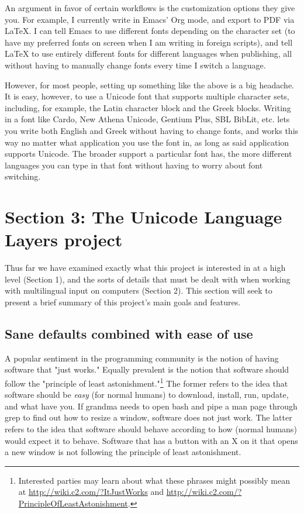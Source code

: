 \documentclass[11pt]{article}
\begin{document}
An argument in favor of certain workflows is the customization options they give you. For example, I currently write in Emacs' Org mode, and export to PDF via \LaTeX{}. I can tell Emacs to use different fonts depending on the character set (to have my preferred fonts on screen when I am writing in foreign scripts), and tell \LaTeX{} to use entirely different fonts for different languages when publishing, all without having to manually change fonts every time I switch a language.

However, for most people, setting up something like the above is a big headache. It is easy, however, to use a Unicode font that supports multiple character sets, including, for example, the Latin character block and the Greek blocks. Writing in a font like Cardo, New Athena Unicode, Gentium Plus, SBL BibLit, etc. lets you write both English and Greek without having to change fonts, and works this way no matter what application you use the font in, as long as said application supports Unicode. The broader support a particular font has, the more different languages you can type in that font without having to worry about font switching.

\section{Section 3: The Unicode Language Layers project}
\label{sec:orgb515006}

Thus far we have examined exactly what this project is interested in at a high level (Section 1), and the sorts of details that must be dealt with when working with multilingual input on computers (Section 2). This section will seek to present a brief summary of this project's main goals and features.

\subsection{Sane defaults combined with ease of use}
\label{sec:orgb37a147}

A popular sentiment in the programming community is the notion of having software that "just works." Equally prevalent is the notion that software should follow the "principle of least astonishment."\footnote{Interested parties may learn about what these phrases might possibly mean at \url{http://wiki.c2.com/?ItJustWorks} and \url{http://wiki.c2.com/?PrincipleOfLeastAstonishment}.} The former refers to the idea that software should be \emph{easy} (for normal humans) to download, install, run, update, and what have you. If grandma needs to open bash and pipe a man page through grep to find out how to resize a window, software does not just work. The latter refers to the idea that software should behave according to how (normal humans) would expect it to behave. Software that has a button with an X on it that opens a new window is not following the principle of least astonishment.
\end{document}
